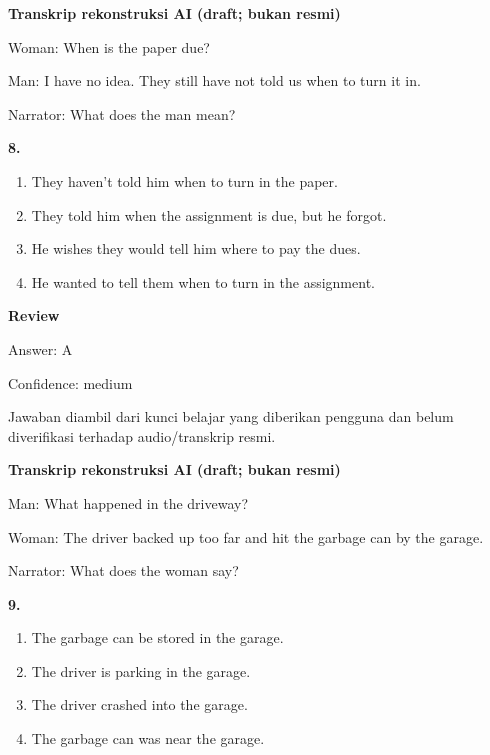 \documentclass[12pt]{article}
\begin{document}
\vspace{0.25\baselineskip}
\begin{exampleblock}
\textbf{Transkrip rekonstruksi AI (draft; bukan resmi)}\par
Woman: When is the paper due?\par
Man: I have no idea. They still have not told us when to turn it in.\par
Narrator: What does the man mean?\par
\end{exampleblock}
\noindent\textbf{8.}
\begin{enumerate}[label=(\Alph*),leftmargin=*,itemsep=0.2em]
\item They haven't told him when to turn in the paper.
\item They told him when the assignment is due, but he forgot.
\item He wishes they would tell him where to pay the dues.
\item He wanted to tell them when to turn in the assignment.
\end{enumerate}
\par
\begingroup
\setlength{\parskip}{0pt}
\setlength{\parindent}{0pt}
\textbf{Review}\par
Answer: A\par
Confidence: medium\par
Jawaban diambil dari kunci belajar yang diberikan pengguna dan belum diverifikasi terhadap audio/transkrip resmi.\par
\endgroup
\par
\vspace{0.25\baselineskip}
\begin{exampleblock}
\textbf{Transkrip rekonstruksi AI (draft; bukan resmi)}\par
Man: What happened in the driveway?\par
Woman: The driver backed up too far and hit the garbage can by the garage.\par
Narrator: What does the woman say?\par
\end{exampleblock}
\noindent\textbf{9.}
\begin{enumerate}[label=(\Alph*),leftmargin=*,itemsep=0.2em]
\item The garbage can be stored in the garage.
\item The driver is parking in the garage.
\item The driver crashed into the garage.
\item The garbage can was near the garage.
\end{enumerate}
\end{document}
